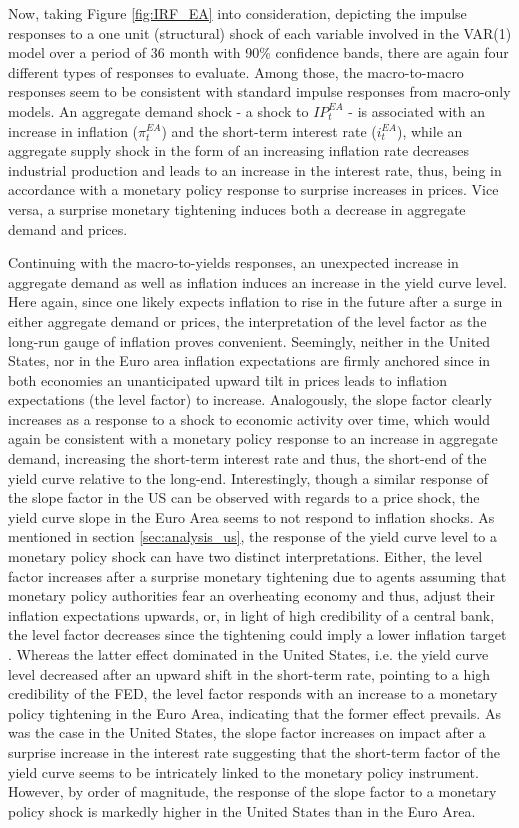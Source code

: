 Now, taking Figure \ref{fig:IRF_EA} into consideration, depicting the impulse responses to a one unit (structural) shock of each variable involved in the VAR(1) model over a period of 36 month with 90\% confidence bands, there are again four different types of responses to evaluate. 
Among those, the macro-to-macro responses seem to be consistent with standard impulse responses from macro-only models. 
An aggregate demand shock - a shock to $IP^{EA}_{t}$ - is associated with an increase in inflation ($\pi^{EA}_{t}$) and the short-term interest rate ($i^{EA}_{t}$), while an aggregate supply shock in the form of an increasing inflation rate decreases industrial production and leads to an increase in the interest rate, thus, being in accordance with a monetary policy response to surprise increases in prices. 
Vice versa, a surprise monetary tightening induces both a decrease in aggregate demand and prices. 

Continuing with the macro-to-yields responses, an unexpected increase in aggregate demand as well as inflation induces an increase in the yield curve level. 
Here again, since one likely expects inflation to rise in the future after a surge in either aggregate demand or prices, the interpretation of the level factor as the long-run gauge of inflation proves convenient.
Seemingly, neither in the United States, nor in the Euro area inflation expectations are firmly anchored since in both economies an unanticipated upward tilt in prices leads to inflation expectations (the level factor) to increase.
Analogously, the slope factor clearly increases as a response to a shock to economic activity over time, which would again be consistent with a monetary policy response to an increase in aggregate demand, increasing the short-term interest rate and thus, the short-end of the yield curve relative to the long-end. 
Interestingly, though a similar response of the slope factor in the US can be observed with regards to a price shock, the yield curve slope in the Euro Area seems to not respond to inflation shocks.  
As mentioned in section \ref{sec:analysis_us}, the response of the yield curve level to a monetary policy shock can have two distinct interpretations.
Either, the level factor increases after a surprise monetary tightening due to agents assuming that monetary policy authorities fear an overheating economy and thus, adjust their inflation expectations upwards, or, in light of high credibility of a central bank, the level factor decreases since the tightening could imply a lower inflation target \citep{diebold2006macroeconomy}. 
Whereas the latter effect dominated in the United States, i.e. the yield curve level decreased after an upward shift in the short-term rate, pointing to a high credibility of the FED, the level factor responds with an increase to a monetary policy tightening in the Euro Area, indicating that the former effect prevails. 
As was the case in the United States, the slope factor increases on impact after a surprise increase in the interest rate suggesting that the short-term factor of the yield curve seems to be intricately linked to the monetary policy instrument. 
However, by order of magnitude, the response of the slope factor to a monetary policy shock is markedly higher in the United States than in the Euro Area. 


